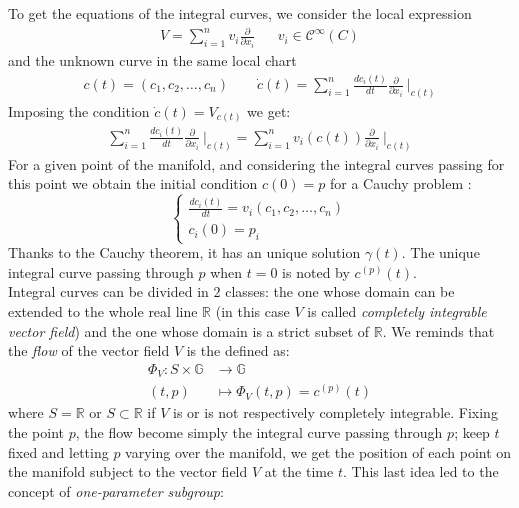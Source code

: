 To get the equations of the integral curves, we consider the local expression
\begin{align*}
V
= 
\sum_{i=1}^{n}v_{i} \frac{\partial}{\partial x_{i}} %
& & 
v_{i} \in \mathcal{C}^{\infty}(C)
\end{align*}
and the unknown curve in the same local chart
\begin{align*}
c(t) = (c_{1}, c_{2}, \dots , c_{n})
\qquad
\dot{c}(t)  = \sum_{i=1}^{n}   \frac{dc_{i}(t)}{dt}   \frac{\partial}{\partial x_{i}} ~\Bigr|_{c(t)} 
\end{align*}
Imposing the condition $\dot{c}(t) = V_{c(t)} $ we get:
\begin{align*}
\sum_{i=1}^{n}   \frac{dc_{i}(t)}{dt}   \frac{\partial}{\partial x_{i}} ~\Bigr|_{c(t)} 
= 
\sum_{i=1}^{n} v_{i}(c(t)) \frac{\partial}{\partial x_{i}} ~\Bigr|_{c(t)}  
\end{align*}
For a given point of the manifold, and considering the integral curves passing for this point we obtain the initial condition $c(0) = p$ for a Cauchy problem :
\begin{equation}\label{eq:caucy_prolem}
\begin{cases}
\frac{dc_{i}(t)}{dt}  =v_{i}(c_{1}, c_{2}, \dots , c_{n})  \\
c_{i}(0) = p_{i}
\end{cases}
\end{equation}
Thanks to the Cauchy theorem, it has an unique solution $\gamma(t)$. The unique integral curve passing through $p$ when $t=0$ is noted by $ c^{(p)}(t)$. \\
Integral curves can be divided in $2$ classes: the one whose domain can be extended to the whole real line $\mathbb{R}$ (in this case $V$ is called \emph{completely integrable vector field}) and the one whose domain is a strict subset of $\mathbb{R}$.
We reminds that the \emph{flow} of the vector field $V$ is the defined as:
\begin{align*}
\Phi_{V}: S\times \mathbb{G} &\longrightarrow \mathbb{G}   \\
(t,p) &\longmapsto  \Phi_{V}(t,p) = c^{(p)}(t)
\end{align*}
where $S = \mathbb{R} $ or $S\subset \mathbb{R}$ if $V$ is or is not respectively completely integrable. Fixing the point $p$, the flow become simply the integral curve passing through $p$; keep $t$ fixed and letting $p$ varying over the manifold, we get the position of each point on the manifold subject to the vector field $V$ at the time $t$. This last idea led to the concept of \emph{one-parameter subgroup}:
